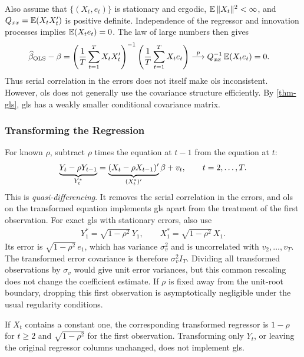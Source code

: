 \documentclass[a4paper,12pt]{article}
\begin{document}
\begin{remark}
    Also assume that $\{(X_t,e_t)\}$ is stationary and ergodic,
    $\operatorname{\mathbb{E}}\|X_t\|^2<\infty$, and $Q_{xx}=\operatorname{\mathbb{E}}(X_tX_t^{\prime})$ is positive definite.
    Independence of the regressor and innovation processes implies $\operatorname{\mathbb{E}}(X_te_t)=0$.
    The law of large numbers then gives
    \begin{align}
        \widehat\beta_{\mathrm{OLS}}-\beta
        &=\left(\frac1T\sum_{t=1}^T X_tX_t^{\prime}\right)^{-1}
          \left(\frac1T\sum_{t=1}^T X_te_t\right)
        \overset{p}{\longrightarrow} Q_{xx}^{-1}\operatorname{\mathbb{E}}(X_te_t)=0.
    \end{align}
    Thus serial correlation in the errors does not itself make \gls{ols} inconsistent.
    However, \gls{ols} does not generally use the covariance structure efficiently.
    By \autoref{thm-gls}, \gls{gls} has a weakly smaller conditional covariance matrix.
\end{remark}

\subsubsection{Transforming the Regression}

For known $\rho$, subtract $\rho$ times the equation at $t-1$ from the equation at $t$:
\begin{align}\label{eq-quasidifference}
    \underbrace{Y_t-\rho Y_{t-1}}_{Y_t^*}
    =\underbrace{(X_t-\rho X_{t-1})^{\prime}}_{(X_t^*)^{\prime}}\beta+v_t,
    \qquad t=2,\ldots,T.
\end{align}
This is \emph{quasi-differencing}.
It removes the serial correlation in the errors, and \gls{ols} on the transformed equation
implements \gls{gls} apart from the treatment of the first observation.
For exact \gls{gls} with stationary errors, also use
\begin{align}
    Y_1^*=\sqrt{1-\rho^2}\,Y_1,\qquad
    X_1^*=\sqrt{1-\rho^2}\,X_1.
\end{align}
Its error is $\sqrt{1-\rho^2}\,e_1$, which has variance $\sigma_v^2$
and is uncorrelated with $v_2,\ldots,v_T$.
The transformed error covariance is therefore $\sigma_v^2 I_T$.
Dividing all transformed observations by $\sigma_v$ would give unit error variances,
but this common rescaling does not change the coefficient estimate.
If $\rho$ is fixed away from the unit-root boundary,
dropping this first observation is asymptotically negligible under the usual regularity conditions.

\begin{remark}
    If $X_t$ contains a constant one, the corresponding transformed regressor is $1-\rho$
    for $t\ge2$ and $\sqrt{1-\rho^2}$ for the first observation.
    Transforming only $Y_t$, or leaving the original regressor columns unchanged,
    does not implement \gls{gls}.
\end{remark}
\end{document}
